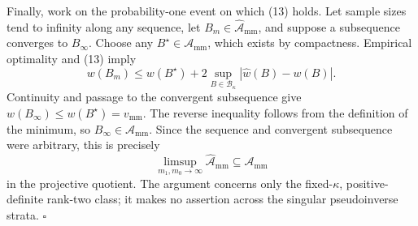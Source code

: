 Finally, work on the probability-one event on which (13) holds.  Let sample sizes tend to infinity along any sequence, let \(B_m\in\widehat{\mathcal A}_{\mathrm{mm}}\), and suppose a subsequence converges to \(B_\infty\).  Choose any \(B^\star\in\mathcal A_{\mathrm{mm}}\), which exists by compactness.  Empirical optimality and (13) imply
\[
w(B_m)
\le w(B^\star)+2\sup_{B\in\mathcal B_\kappa}
|\widehat w(B)-w(B)|.
\tag{15}
\]
Continuity and passage to the convergent subsequence give \(w(B_\infty)\le w(B^\star)=v_{\mathrm{mm}}\).  The reverse inequality follows from the definition of the minimum, so \(B_\infty\in\mathcal A_{\mathrm{mm}}\).  Since the sequence and convergent subsequence were arbitrary, this is precisely
\[
\limsup_{m_1,m_0\to\infty}\widehat{\mathcal A}_{\mathrm{mm}}
\subseteq\mathcal A_{\mathrm{mm}}
\]
in the projective quotient.  The argument concerns only the fixed-\(\kappa\), positive-definite rank-two class; it makes no assertion across the singular pseudoinverse strata. \(\square\)